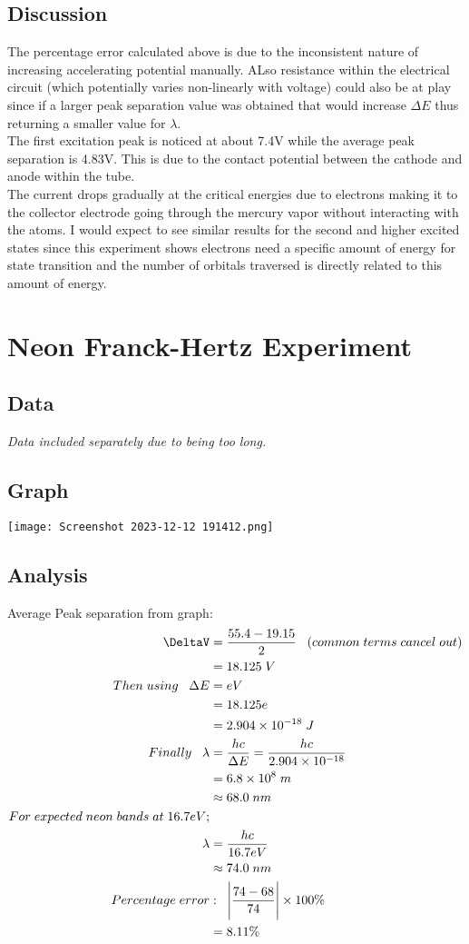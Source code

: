 \documentclass[11pt]{article}
\begin{document}
\subsection{Discussion}
The percentage error calculated above is due to the inconsistent nature of increasing accelerating potential manually. ALso resistance within the electrical circuit (which potentially varies non-linearly with voltage) could  also be at play since if a larger peak separation value was obtained that would increase $\Delta E$ thus returning a smaller value for $\lambda$. \\
The first excitation peak is noticed at about 7.4V while the average peak separation is 4.83V. This is due to the contact potential between the cathode and anode within the tube.\\
The current drops gradually at the critical energies due to electrons making it to the collector electrode going through the mercury vapor without interacting with the atoms. I would expect to see similar results for the second and higher excited states since this experiment shows electrons need a specific amount of energy for state transition and the number of orbitals traversed is directly related to this amount of energy.  

\newpage
\section{Neon Franck-Hertz Experiment}
\subsection{Data}
\textit{Data included separately due to being too long.}
\subsection{Graph}
\texttt{[image: Screenshot 2023-12-12 191412.png]}
\subsection{Analysis}
Average Peak separation from graph:
\begin{align*}
    \DeltaV&=\frac{55.4-19.15}{2}\;\;\;(common\; terms\; cancel\; out)\\
    &=18.125\;V\\
    Then\;using\;\;\;\Delta E&=eV\\
    &=18.125e\\&=2.904\times 10^{-18}\;J\\
    Finally\;\;\;\lambda&=\frac{hc}{\Delta E}=\frac{hc}{2.904\times 10^{-18}}\\
    &=6.8\times10^8\;m\\
    &\approx68.0\;nm\\
    For\;expected\;neon\;bands\;at\;16.7eV;\\
    \lambda&=\frac{hc}{16.7eV}\\
    &\approx74.0\;nm\\
    Percentage\;error&:\;\;
    \Bigg|\frac{74-68}{74}\Bigg|\times100\%\\
    &=8.11\%
\end{align*}
\end{document}
